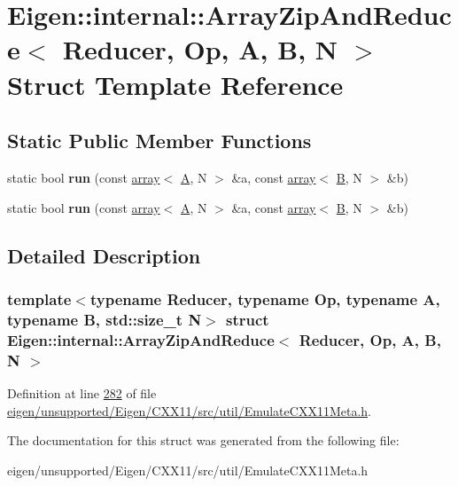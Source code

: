 \hypertarget{struct_eigen_1_1internal_1_1_array_zip_and_reduce}{}\section{Eigen\+:\+:internal\+:\+:Array\+Zip\+And\+Reduce$<$ Reducer, Op, A, B, N $>$ Struct Template Reference}
\label{struct_eigen_1_1internal_1_1_array_zip_and_reduce}
\subsection*{Static Public Member Functions}
\begin{DoxyCompactItemize}
\item 
\mbox{\label{struct_eigen_1_1internal_1_1_array_zip_and_reduce_a8cfdcb7b280d76182b8583b9064ed780}} 
static bool {\bfseries run} (const \hyperlink{class_eigen_1_1array}{array}$<$ \hyperlink{group___core___module_class_eigen_1_1_matrix}{A}, N $>$ \&a, const \hyperlink{class_eigen_1_1array}{array}$<$ \hyperlink{group___core___module_class_eigen_1_1_matrix}{B}, N $>$ \&b)
\item 
\mbox{\label{struct_eigen_1_1internal_1_1_array_zip_and_reduce_a8cfdcb7b280d76182b8583b9064ed780}} 
static bool {\bfseries run} (const \hyperlink{class_eigen_1_1array}{array}$<$ \hyperlink{group___core___module_class_eigen_1_1_matrix}{A}, N $>$ \&a, const \hyperlink{class_eigen_1_1array}{array}$<$ \hyperlink{group___core___module_class_eigen_1_1_matrix}{B}, N $>$ \&b)
\end{DoxyCompactItemize}


\subsection{Detailed Description}
\subsubsection*{template$<$typename Reducer, typename Op, typename A, typename B, std\+::size\+\_\+t N$>$\newline
struct Eigen\+::internal\+::\+Array\+Zip\+And\+Reduce$<$ Reducer, Op, A, B, N $>$}



Definition at line \hyperlink{eigen_2unsupported_2_eigen_2_c_x_x11_2src_2util_2_emulate_c_x_x11_meta_8h_source_l00282}{282} of file \hyperlink{eigen_2unsupported_2_eigen_2_c_x_x11_2src_2util_2_emulate_c_x_x11_meta_8h_source}{eigen/unsupported/\+Eigen/\+C\+X\+X11/src/util/\+Emulate\+C\+X\+X11\+Meta.\+h}.



The documentation for this struct was generated from the following file\+:\begin{DoxyCompactItemize}
\item 
eigen/unsupported/\+Eigen/\+C\+X\+X11/src/util/\+Emulate\+C\+X\+X11\+Meta.\+h\end{DoxyCompactItemize}
